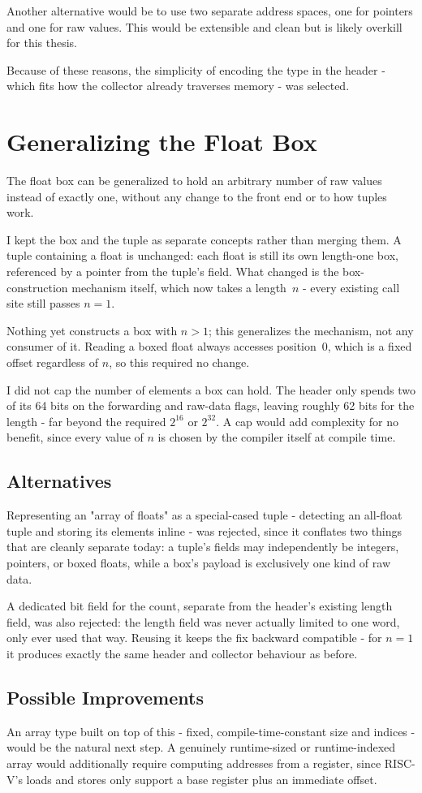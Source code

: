 Another alternative would be to use two separate address spaces, one for pointers and one for raw values. This would be extensible and clean but is likely overkill for this thesis.

Because of these reasons, the simplicity of encoding the type in the header - which fits how the collector already traverses memory - was selected.


\section{Generalizing the Float Box}

The float box can be generalized to hold an arbitrary number of raw values instead of exactly one, without any change to the front end or to how tuples work.

I kept the box and the tuple as separate concepts rather than merging them. A tuple containing a float is unchanged: each float is still its own length-one box, referenced by a pointer from the tuple's field. What changed is the box-construction mechanism itself, which now takes a length~$n$ - every existing call site still passes $n=1$.

Nothing yet constructs a box with $n>1$; this generalizes the mechanism, not any consumer of it. Reading a boxed float always accesses position~0, which is a fixed offset regardless of $n$, so this required no change.

I did not cap the number of elements a box can hold. The header only spends two of its 64 bits on the forwarding and raw-data flags, leaving roughly 62 bits for the length - far beyond the required $2^{16}$ or $2^{32}$. A cap would add complexity for no benefit, since every value of $n$ is chosen by the compiler itself at compile time.

\subsection{Alternatives}

Representing an "array of floats" as a special-cased tuple - detecting an all-float tuple and storing its elements inline - was rejected, since it conflates two things that are cleanly separate today: a tuple's fields may independently be integers, pointers, or boxed floats, while a box's payload is exclusively one kind of raw data.

A dedicated bit field for the count, separate from the header's existing length field, was also rejected: the length field was never actually limited to one word, only ever used that way. Reusing it keeps the fix backward compatible - for $n=1$ it produces exactly the same header and collector behaviour as before.

\subsection{Possible Improvements}

An array type built on top of this - fixed, compile-time-constant size and indices - would be the natural next step. A genuinely runtime-sized or runtime-indexed array would additionally require computing addresses from a register, since RISC-V's loads and stores only support a base register plus an immediate offset.

